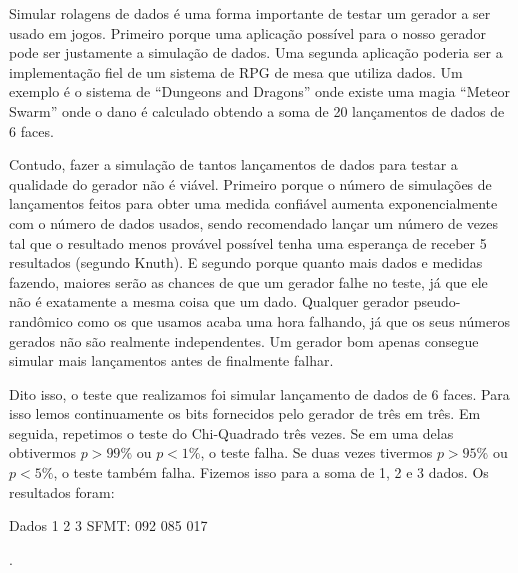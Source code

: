 Simular rolagens de dados é uma forma importante de testar um gerador
a ser usado em jogos. Primeiro porque uma aplicação possível para o
nosso gerador pode ser justamente a simulação de dados. Uma segunda
aplicação poderia ser a implementação fiel de um sistema de RPG de
mesa que utiliza dados. Um exemplo é o sistema de ``Dungeons and
Dragons'' onde existe uma magia ``Meteor Swarm'' onde o dano é
calculado obtendo a soma de 20 lançamentos de dados de 6 faces.

Contudo, fazer a simulação de tantos lançamentos de dados para testar
a qualidade do gerador não é viável. Primeiro porque o número de
simulações de lançamentos feitos para obter uma medida confiável
aumenta exponencialmente com o número de dados usados, sendo
recomendado lançar um número de vezes tal que o resultado menos
provável possível tenha uma esperança de receber 5 resultados (segundo
Knuth). E segundo porque quanto mais dados e medidas fazendo, maiores
serão as chances de que um gerador falhe no teste, já que ele não é
exatamente a mesma coisa que um dado. Qualquer gerador
pseudo-randômico como os que usamos acaba uma hora falhando, já que os
seus números gerados não são realmente independentes. Um gerador bom
apenas consegue simular mais lançamentos antes de finalmente falhar.

Dito isso, o teste que realizamos foi simular lançamento de dados de 6
faces. Para isso lemos continuamente os bits fornecidos pelo gerador
de três em três. Em seguida, repetimos o teste do Chi-Quadrado três
vezes. Se em uma delas obtivermos $p > 99\%$ ou $p < 1\%$, o teste
falha. Se duas vezes tivermos $p> 95\%$ ou $p < 5\%$, o teste também
falha. Fizemos isso para a soma de 1, 2 e 3 dados. Os resultados
foram:

Dados    1   2    3    
SFMT:  092 085  017




.

\fim
